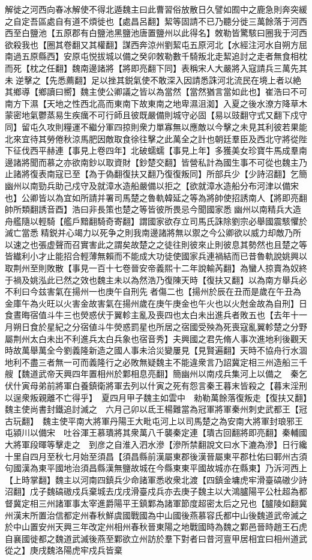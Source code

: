 解徙之河西向春冰解使不得北遁魏主曰此曹習俗放散日久譬如囿中之鹿急則奔突緩之自定吾區處自有道不煩徙也【處昌呂翻】絜等固請不已乃聽分徙三萬餘落于河西西至白鹽池【五原郡有白鹽池黑鹽池唐置鹽州以此得名】敇勒皆驚駭曰圈我于河西欲殺我也【圈其卷翻又其權翻】謀西奔涼州劉絜屯五原河北【水經注河水自朔方屈南過五原縣西】安原屯悦拔城以備之癸卯敇勒數千騎叛北走絜追討之走者無食相枕而死【枕之任翻】魏南邊諸將【將即亮翻下同】表稱宋人大嚴將入寇請兵三萬先其未逆擊之【先悉薦翻】足以挫其鋭氣使不敢深入因請悉誅河北流民在境上者以絶其鄉導【鄉讀曰嚮】魏主使公卿議之皆以為當然【當然猶言當如此也】崔浩曰不可南方下濕【天地之性西北高而東南下故東南之地卑濕沮洳】入夏之後水潦方降草木蒙密地氣鬱蒸易生疾癘不可行師且彼既嚴備則城守必固【易以豉翻守式又翻下戍守同】留屯久攻則糧運不繼分軍四掠則衆力單寡無以應敵以今擊之未見其利彼若果能北來宜待其勞倦秋涼馬肥因敵取食徐往擊之此萬全之計也朝廷羣臣及西北守將從陛下征伐西平赫連【事見上卷四年】北破蠕蠕【事見上年】多獲美女珍寶牛馬成羣南邊諸將聞而慕之亦欲南鈔以取資財【鈔楚交翻】皆營私計為國生事不可從也魏主乃止諸將復表南寇已至【為于偽翻復扶又翻乃復復叛同】所部兵少【少詩沼翻】乞簡幽州以南勁兵助己戍守及就漳水造船嚴備以拒之【欲就漳水造船分布河津以備宋也】公卿皆以為宜如所請并署司馬楚之魯軌韓延之等為將帥使招誘南人【將即亮翻帥所類翻誘音酉】浩曰非長策也楚之等皆彼所畏忌今聞國家悉幽州以南精兵大造舟艦隨以輕騎【艦戶黯翻騎奇寄翻】謂國家欲存立司馬氏誅除劉宗必舉國震駭懼於滅亡當悉精鋭并心竭力以死争之則我南邊諸將無以禦之今公卿欲以威力却敵乃所以速之也張虚聲而召實害此之謂矣故楚之之徒往則彼來止則彼息其勢然也且楚之等皆纎利小才止能招合輕薄無賴而不能成大功徒使國家兵連禍結而已昔魯軌說姚興以取荆州至則敗散【事見一百十七卷晉安帝義熙十二年說輸芮翻】為蠻人掠賣為奴終于禍及姚泓此已然之效也魏主未以為然浩乃復陳天時【復扶又翻】以為南方舉兵必不利曰今兹害氣在揚州一也庚午自刑先者傷二也【揚州於辰在丑而是歲在午丑為金庫午為火旺以火害金故害氣在揚州歲在庚午庚金也午火也以火尅金故為自刑】日食晝晦宿值斗牛三也熒惑伏于翼軫主亂及喪四也太白未出進兵者敗五也【去年十一月朔日食於星紀之分宿値斗牛熒惑罰星也所居之宿國受殃為死喪寇亂翼軫楚之分野屬荆州太白未出不利進兵太白兵象也宿音秀】夫興國之君先脩人事次進地利後觀天時故萬舉萬全今劉義隆新造之國人事未洽災變屢見【見賢遍翻】天時不協舟行水涸地利不盡三者無一可而義隆行之必敗無疑魏主不能違衆言乃詔冀定相三州造船三千艘【魏道武帝天興四年置相州於鄴相息亮翻】簡幽州以南戍兵集河上以備之　秦乞伏什寅母弟前將軍白養鎮衛將軍去列以什寅之死有怨言秦王暮末皆殺之【暮末淫刑以逞衆叛親離不亡得乎】　夏四月甲子魏主如雲中　勑勒萬餘落復叛走【復扶又翻】魏主使尚書封鐵追討滅之　六月己卯以氐王楊難當為冠軍將軍秦州刺史武都王【冠古玩翻】　魏主使平南大將軍丹陽王大毗屯河上以司馬楚之為安南大將軍封琅邪王屯潁川以備宋　吐谷渾王慕璝將其衆萬八千襲秦定連【璝古回翻將即亮翻】秦輔國大將軍段暉等擊走之　到彦之自淮入泗水滲【滲所禁翻說文曰水下漉為滲】日行纔十里自四月至秋七月始至須昌【須昌縣前漢屬東郡後漢晉屬東平郡杜佑曰鄆州古須句國漢為東平國地治須昌縣漢無鹽故城在今縣東東平國故城亦在縣東】乃泝河西上【上時掌翻】魏主以河南四鎮兵少命諸軍悉收衆北渡【四鎮金墉虎牢滑臺碻磝少詩沼翻】戊子魏碻磝戍兵棄城去戊戌滑臺戍兵亦去庚子魏主以大鴻臚陽平公杜超為都督冀定相三州諸軍事太宰進爵陽平王鎮鄴為諸軍節度超密太后之兄也【臚陵如翻冀州漢末所置治信都定州春秋鮮虞國戰國為中山國後燕慕容氏都中山後魏道武帝滅之於中山置安州天興三年改定州相州春秋晉東陽之地戰國時為魏之鄴邑晉時趙王石虎自襄國徙都之魏道武滅後燕至鄴欲立州訪於羣下對者曰昔河亶甲居相宜曰相州道武從之】庚戌魏洛陽虎牢戍兵皆棄